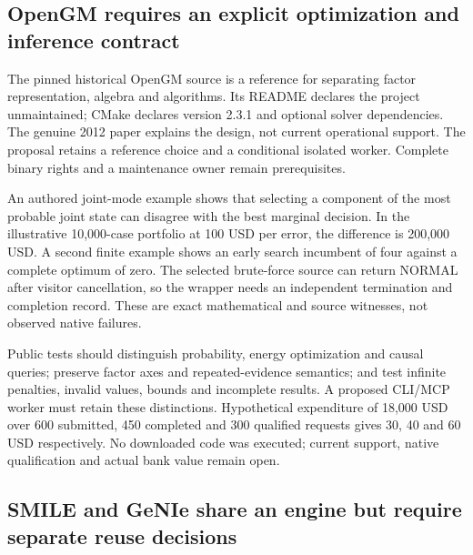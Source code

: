 \hypertarget{opengm-requires-an-explicit-optimization-and-inference-contract}{%
\subsection{OpenGM requires an explicit optimization and inference
contract}\label{opengm-requires-an-explicit-optimization-and-inference-contract}}

The pinned historical OpenGM source is a reference for separating factor
representation, algebra and algorithms. Its README declares the project
unmaintained; CMake declares version 2.3.1 and optional solver
dependencies. The genuine 2012 paper explains the design, not current
operational support. The proposal retains a reference choice and a
conditional isolated worker. Complete binary rights and a maintenance
owner remain prerequisites.
\citep{exec24_opengm_source,exec24_opengm_paper,exec24_opengm_choice}

An authored joint-mode example shows that selecting a component of the
most probable joint state can disagree with the best marginal decision.
In the illustrative 10,000-case portfolio at 100 USD per error, the
difference is 200,000 USD. A second finite example shows an early search
incumbent of four against a complete optimum of zero. The selected
brute-force source can return NORMAL after visitor cancellation, so the
wrapper needs an independent termination and completion record. These
are exact mathematical and source witnesses, not observed native
failures. \citep{exec24_opengm_source,exec24_opengm_choice}

Public tests should distinguish probability, energy optimization and
causal queries; preserve factor axes and repeated-evidence semantics;
and test infinite penalties, invalid values, bounds and incomplete
results. A proposed CLI/MCP worker must retain these distinctions.
Hypothetical expenditure of 18,000 USD over 600 submitted, 450 completed
and 300 qualified requests gives 30, 40 and 60 USD respectively. No
downloaded code was executed; current support, native qualification and
actual bank value remain open. \citep{exec24_opengm_choice}

\hypertarget{smile-and-genie-share-an-engine-but-require-separate-reuse-decisions}{%
\subsection{SMILE and GeNIe share an engine but require separate reuse
decisions}\label{smile-and-genie-share-an-engine-but-require-separate-reuse-decisions}}

